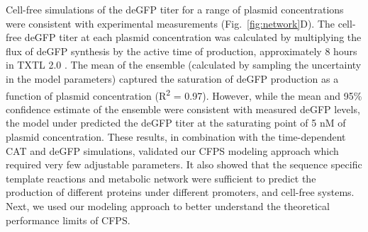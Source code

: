 \documentclass[journal=asbcd6,manuscript=article]{achemso}
\begin{document}
Cell-free simulations of the deGFP titer for a range of plasmid concentrations were consistent with experimental measurements (Fig.~\ref{fig:network}D).
The cell-free deGFP titer at each plasmid concentration was calculated by multiplying the flux of deGFP synthesis by the active time of production, approximately 8 hours in TXTL 2.0 \cite{Garamella:2016aa}.
The mean of the ensemble (calculated by sampling the uncertainty in the model parameters) captured the saturation of deGFP production as a function of plasmid concentration  (R\textsuperscript{2} = 0.97).
However, while the mean and 95\% confidence estimate of the ensemble were consistent with measured deGFP levels, the model under predicted the deGFP titer at the saturating point of 5 nM of plasmid concentration.
These results, in combination with the time-dependent CAT and deGFP simulations, validated our CFPS modeling approach which required very few adjustable parameters.
It also showed that the sequence specific template reactions and metabolic network were sufficient to predict the production of different proteins under different promoters, and cell-free systems.
Next, we used our modeling approach to better understand the theoretical performance limits of CFPS.

\end{document}
